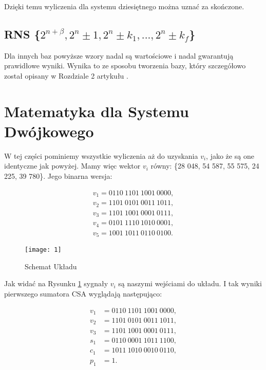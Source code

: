 \documentclass[comsoc]{IEEEtran}
\begin{document}
	Dzięki temu wyliczenia dla systemu dziesiętnego można uznać za skończone.
	
	\subsection{RNS \{$2^{n+\beta}, 2^n\pm1, 2^n\pm k_{1},...,2^{n}\pm k_{f}$\}}
	Dla innych baz powyższe wzory nadal są wartościowe i nadal gwarantują prawidłowe wyniki. Wynika to ze sposobu tworzenia bazy, który szczegółowo został opisany w Rozdziale 2 artykułu \cite{1}.
	
	\section{Matematyka dla Systemu Dwójkowego}
	
	W tej części pominiemy wszystkie wyliczenia aż do uzyskania $v_{i}$, jako że są one identyczne jak powyżej. Mamy więc wektor  $v_{i}$ równy: \{28 048, 54 587, 55 575, 24 225, 39 780\}. Jego binarna wersja:
	
	\begin{equation} \label{eq:csa1}
	\begin{aligned}
	v_{1} = 0110~1101~1001~0000,\\
	v_{2} = 1101~0101~0011~1011,\\
	v_{3} = 1101~1001~0001~0111,\\
	v_{4} = 0101~1110~1010~0001,\\
	v_{5} = 1001~1011~0110~0100.
	\end{aligned}
	\end{equation}
	
	\begin{figure}[h]
		\centering
		\texttt{[image: 1]}
		\captionsetup{justification=centering}
		\caption{Schemat Układu}
		\label{fig:2}
	\end{figure}

	Jak widać na Rysunku \ref{fig:2} sygnały $v_{i}$ są naszymi wejściami do układu. I tak wyniki pierwszego sumatora CSA wyglądają następująco:
	
	\begin{equation} \label{eq:csa2}
	\begin{aligned}
	v_{1}& = 0110~1101~1001~0000,\\
	v_{2}& = 1101~0101~0011~1011,\\
	v_{3}& = 1101~1001~0001~0111,\\
	s_{1}& = 0110~0001~1011~1100,\\
	c_{1}& = 1011~1010~0010~0110,\\
	p_{1}& = 1.
	\end{aligned}
	\end{equation}
	
\end{document}
